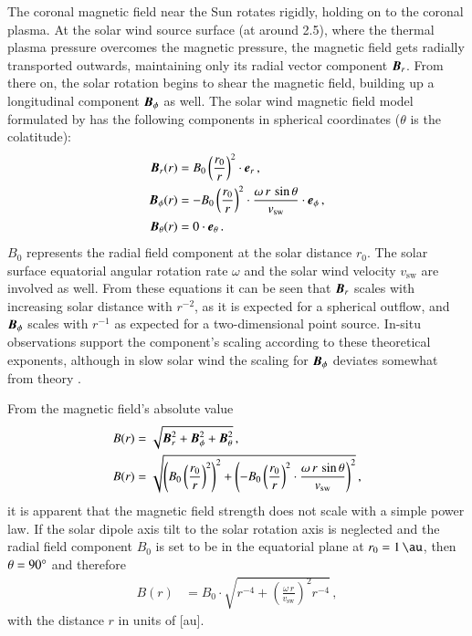The coronal magnetic field near the Sun rotates rigidly, holding on to the coronal plasma. At the solar wind source surface (at around \SI{2.5}{\Rs}), where the thermal plasma pressure overcomes the magnetic pressure, the magnetic field gets radially transported outwards, maintaining only its radial vector component $\boldsymbol{B}_r$. From there on, the solar rotation begins to shear the magnetic field, building up a longitudinal component $\boldsymbol{B}_\phi$ as well. The solar wind magnetic field model formulated by \citet{Parker1958} has the following components in spherical coordinates ($\theta$ is the colatitude):
\begin{align}
	\boldsymbol{B}_r(r) &= B_0 \left(\frac{r_0}{r}\right)^2 \cdot \boldsymbol{e}_r\,,\\
	\boldsymbol{B}_\phi(r) &= -B_0 \left(\frac{r_0}{r}\right)^2 \cdot \frac{\omega\,r\,\sin\theta}{v_\text{sw}} \cdot \boldsymbol{e}_\phi	\,,	\label{eq:b_phi_vector}\\
	\boldsymbol{B}_\theta(r) &= 0 \cdot \boldsymbol{e}_\theta\,.
\end{align}
$B_0$ represents the radial field component at the solar distance $r_0$. The solar surface equatorial angular rotation rate $\omega$ and the solar wind velocity $v_\text{sw}$ are involved as well. From these equations it can be seen that $\boldsymbol{B}_r$ scales with increasing solar distance with $r^{-2}$, as it is expected for a spherical outflow, and $\boldsymbol{B}_\phi$ scales with $r^{-1}$ as expected for a two-dimensional point source. In-situ observations support the component's scaling according to these theoretical exponents, although in slow solar wind the scaling for $\boldsymbol{B}_\phi$ deviates somewhat from theory \citep{Mariani1978}.

From the magnetic field's absolute value
\begin{align}
	B(r) &= \sqrt{\boldsymbol{B}_r^2 + \boldsymbol{B}_\phi^2 + \boldsymbol{B}_\theta^2}\,,	\label{eq:B_absolute}\\
	B(r) &= \sqrt{\left(B_0 \left(\frac{r_0}{r}\right)^2\right)^2 + \left(-B_0 \left(\frac{r_0}{r}\right)^2 \cdot \frac{\omega\,r\,\sin\theta}{v_\text{sw}}\right)^2}\,,
\end{align}
it is apparent that the magnetic field strength does not scale with a simple power law. If the solar dipole axis tilt to the solar rotation axis is neglected and the radial field component $B_0$ is set to be in the equatorial plane at $r_0 = \SI{1}{\au}$, then $\theta = 90\degree$ and therefore
\begin{align}
	B(r) &= B_0 \cdot \sqrt{r^{-4} + \left(\frac{\omega\,r}{v_\text{sw}}\right)^2 r^{-4}}\,,	\label{eq:B_1au}
\end{align}
with the distance $r$ in units of [au].

